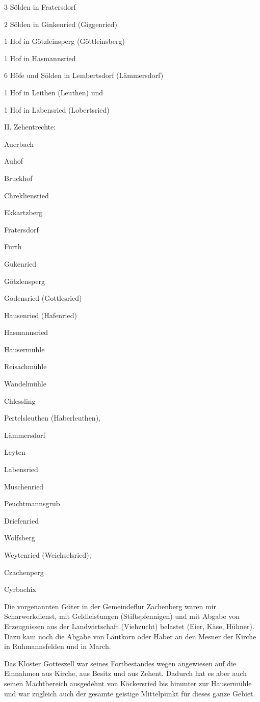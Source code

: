 3 Sölden in Fratersdorf

2 Sölden in Ginkenried (Giggenried)

1 Hof in Götzleinsperg (Göttleinsberg)

1 Hof in Hasmannsried

6 Höfe und Sölden in Lembertsdorf (Lämmersdorf)

1 Hof in Leithen (Leuthen) und

1 Hof in Labensried (Lobertsried)



II. Zehentrechte:



Auerbach

Auhof

Bruckhof

Chrekliensried

Ekkartzberg

Fratersdorf

Furth

Gukenried

Götzlensperg

Godensried (Gottlesried)

Hausenried (Hafenried)

Hasmannsried

Hausermühle

Reisachmühle

Wandelmühle

Chlessling

Pertelsleuthen (Haberleuthen),

Lämmersdorf

Leyten

Labensried

Muschenried

Peuchtmannsgrub

Driefenried

Wolfsberg

Weytenried (Weichselsried),

Czachenperg

Cyrbachix





Die vorgenannten Güter in der Gemeindeflur Zachenberg waren mir Scharwerkdienst,
mit Geldleistungen (Stiftspfennigen) und mit Abgabe von Erzeugnissen aus der
Landwirtschaft (Viehzucht) belastet (Eier, Käse, Hühner). Dazu kam noch die
Abgabe von Läutkorn oder Haber an den Mesner der Kirche in Ruhmannsfelden und in
March.

Das Kloster Gotteszell war seines Fortbestandes wegen angewiesen auf die
Einnahmen aus Kirche, aus Besitz und aus Zehent. Dadurch hat es aber auch seinen
Machtbereich ausgedehnt von Köckersried bis hinunter zur Hausermühle und war
zugleich auch der gesamte geistige Mittelpunkt für dieses ganze Gebiet.

